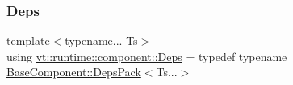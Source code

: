 \subsubsection{\texorpdfstring{Deps}{Deps}}
{\footnotesize\ttfamily template$<$typename... Ts$>$ \\
using \hyperlink{namespacevt_1_1runtime_1_1component_afad3a7a92e35d9ab3d81540d9275213c}{vt\+::runtime\+::component\+::\+Deps} = typedef typename \hyperlink{structvt_1_1runtime_1_1component_1_1_base_component_1_1_deps_pack}{Base\+Component\+::\+Deps\+Pack}$<$Ts...$>$}

